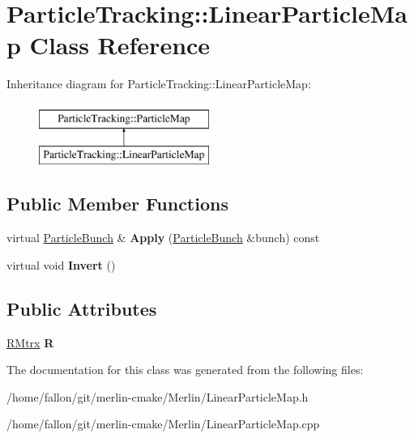 \hypertarget{classParticleTracking_1_1LinearParticleMap}{}\section{Particle\+Tracking\+:\+:Linear\+Particle\+Map Class Reference}
\label{classParticleTracking_1_1LinearParticleMap}
Inheritance diagram for Particle\+Tracking\+:\+:Linear\+Particle\+Map\+:\begin{figure}[H]
\begin{center}
\leavevmode
\includegraphics[height=2.000000cm]{classParticleTracking_1_1LinearParticleMap}
\end{center}
\end{figure}
\subsection*{Public Member Functions}
\begin{DoxyCompactItemize}
\item 
\mbox{\label{classParticleTracking_1_1LinearParticleMap_a5a2f888af408bdc890b99a044bf746fe}} 
virtual \hyperlink{classParticleTracking_1_1ParticleBunch}{Particle\+Bunch} \& {\bfseries Apply} (\hyperlink{classParticleTracking_1_1ParticleBunch}{Particle\+Bunch} \&bunch) const
\item 
\mbox{\label{classParticleTracking_1_1LinearParticleMap_abe75484013b58ce19857ce106d5b9424}} 
virtual void {\bfseries Invert} ()
\end{DoxyCompactItemize}
\subsection*{Public Attributes}
\begin{DoxyCompactItemize}
\item 
\mbox{\label{classParticleTracking_1_1LinearParticleMap_a8b608bf5c827370d5a85e3fc61b6fdff}} 
\hyperlink{classRMtrx}{R\+Mtrx} {\bfseries R}
\end{DoxyCompactItemize}


The documentation for this class was generated from the following files\+:\begin{DoxyCompactItemize}
\item 
/home/fallon/git/merlin-\/cmake/\+Merlin/Linear\+Particle\+Map.\+h\item 
/home/fallon/git/merlin-\/cmake/\+Merlin/Linear\+Particle\+Map.\+cpp\end{DoxyCompactItemize}
